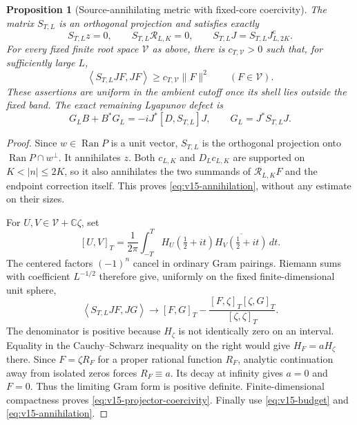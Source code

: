 \documentclass[11pt]{article}
\newtheorem{proposition}[theorem]{Proposition}
\theoremstyle{remark}
\newcommand{\ip}[2]{\left\langle #1,#2\right\rangle}
\newcommand{\Jc}{J^{\mathrm c}}
\begin{document}
\begin{proposition}[Source-annihilating metric with fixed-core coercivity]
\label{prop:v15-projector}
The matrix $S_{T,L}$ is an orthogonal projection and satisfies exactly
\begin{equation}\label{eq:v15-annihilation}
 S_{T,L}z=0,\qquad S_{T,L}\mathcal R_{L,K}=0,
 \qquad S_{T,L}J=S_{T,L}\Jc_{L,2K}.
\end{equation}
For every fixed finite root space $\mathcal V$ as above, there is
$c_{T,\mathcal V}>0$ such that, for sufficiently large $L$,
\begin{equation}\label{eq:v15-projector-coercivity}
 \ip{S_{T,L}JF}{JF}\ge c_{T,\mathcal V}\|F\|^2
 \qquad(F\in\mathcal V).
\end{equation}
These assertions are uniform in the ambient cutoff once its shell lies
outside the fixed band. The exact remaining Lyapunov defect is
\begin{equation}\label{eq:v15-commutator-budget}
 G_LB+B^*G_L=-iJ^*[D,S_{T,L}]J,
 \qquad G_L=J^*S_{T,L}J.
\end{equation}
\end{proposition}
\begin{proof}
Since $w\in\operatorname{Ran}P$ is a unit vector, $S_{T,L}$ is the
orthogonal projection onto $\operatorname{Ran}P\cap w^\perp$.
It annihilates $z$. Both $c_{L,K}$ and $D_Lc_{L,K}$ are supported on
$K<|n|\le2K$, so it also annihilates the two summands of
$\mathcal R_{L,K}F$ and the endpoint correction itself. This proves
\eqref{eq:v15-annihilation}, without any estimate on their sizes.

For $U,V\in\mathcal V+\mathbb C\zeta$, set
\[
 [U,V]_T=\frac1{2\pi}\int_{-T}^T
 H_U(\tfrac12+it)\overline{H_V(\tfrac12+it)}\,dt.
\]
The centered factors $(-1)^n$ cancel in ordinary Gram pairings.
Riemann sums with coefficient $L^{-1/2}$ therefore give, uniformly on
the fixed finite-dimensional unit sphere,
\begin{equation}\label{eq:v15-schur-gram}
 \ip{S_{T,L}JF}{JG}\longrightarrow
 [F,G]_T-\frac{[F,\zeta]_T[\zeta,G]_T}{[\zeta,\zeta]_T}.
\end{equation}
The denominator is positive because $H_\zeta$ is not identically zero
on an interval. Equality in the Cauchy--Schwarz inequality on the right
would give $H_F=aH_\zeta$ there. Since $F=\zeta R_F$ for a proper
rational function $R_F$, analytic continuation away from isolated zeros
forces $R_F\equiv a$. Its decay at infinity gives $a=0$ and $F=0$.
Thus the limiting Gram form is positive definite. Finite-dimensional
compactness proves \eqref{eq:v15-projector-coercivity}. Finally use
\eqref{eq:v15-budget} and \eqref{eq:v15-annihilation}.
\end{proof}
\end{document}
